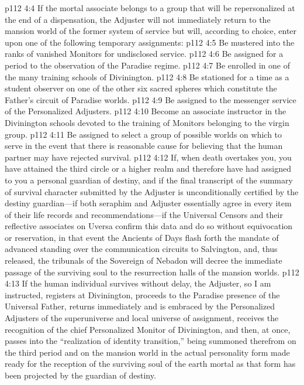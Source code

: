 \vs p112 4:4 If the mortal associate belongs to a group that will be repersonalized at the end of a dispensation, the Adjuster will not immediately return to the mansion world of the former system of service but will, according to choice, enter upon one of the following temporary assignments:
\pc \vs p112 4:5 \bibnobreakspace Be mustered into the ranks of vanished Monitors for undisclosed service.
\vs p112 4:6 \bibnobreakspace Be assigned for a period to the observation of the Paradise regime.
\vs p112 4:7 \bibnobreakspace Be enrolled in one of the many training schools of Divinington.
\vs p112 4:8 \bibnobreakspace Be stationed for a time as a student observer on one of the other six sacred spheres which constitute the Father’s circuit of Paradise worlds.
\vs p112 4:9 \bibnobreakspace Be assigned to the messenger service of the Personalized Adjusters.
\vs p112 4:10 \bibnobreakspace Become an associate instructor in the Divinington schools devoted to the training of Monitors belonging to the virgin group.
\vs p112 4:11 \bibnobreakspace Be assigned to select a group of possible worlds on which to serve in the event that there is reasonable cause for believing that the human partner may have rejected survival.
\pc \vs p112 4:12 If, when death overtakes you, you have attained the third circle or a higher realm and therefore have had assigned to you a personal guardian of destiny, and if the final transcript of the summary of survival character submitted by the Adjuster is unconditionally certified by the destiny guardian---if both seraphim and Adjuster essentially agree in every item of their life records and recommendations---if the Universal Censors and their reflective associates on Uversa confirm this data and do so without equivocation or reservation, in that event the Ancients of Days flash forth the mandate of advanced standing over the communication circuits to Salvington, and, thus released, the tribunals of the Sovereign of Nebadon will decree the immediate passage of the surviving soul to the resurrection halls of the mansion worlds.\plusone
\vs p112 4:13 If the human individual survives without delay, the Adjuster, so I am instructed, registers at Divinington, proceeds to the Paradise presence of the Universal Father, returns immediately and is embraced by the Personalized Adjusters of the superuniverse and local universe of assignment, receives the recognition of the chief Personalized Monitor of Divinington, and then, at once, passes into the “realization of identity transition,” being summoned therefrom on the third period and on the mansion world in the actual personality form made ready for the reception of the surviving soul of the earth mortal as that form has been projected by the guardian of destiny.
